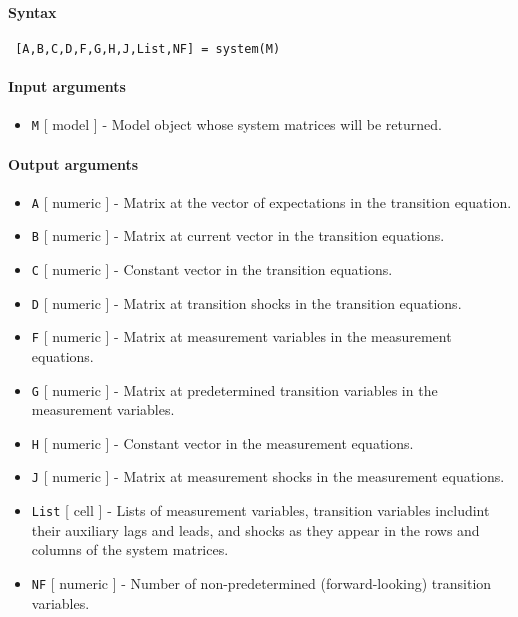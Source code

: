


	\paragraph{Syntax}
 
 \begin{verbatim}
 [A,B,C,D,F,G,H,J,List,NF] = system(M)
 \end{verbatim}
 
 \paragraph{Input arguments}
 
 \begin{itemize}
 \item
   \texttt{M} {[} model {]} - Model object whose system matrices will be
   returned.
 \end{itemize}
 
 \paragraph{Output arguments}
 
 \begin{itemize}
 \item
   \texttt{A} {[} numeric {]} - Matrix at the vector of expectations in
   the transition equation.
 \item
   \texttt{B} {[} numeric {]} - Matrix at current vector in the
   transition equations.
 \item
   \texttt{C} {[} numeric {]} - Constant vector in the transition
   equations.
 \item
   \texttt{D} {[} numeric {]} - Matrix at transition shocks in the
   transition equations.
 \item
   \texttt{F} {[} numeric {]} - Matrix at measurement variables in the
   measurement equations.
 \item
   \texttt{G} {[} numeric {]} - Matrix at predetermined transition
   variables in the measurement variables.
 \item
   \texttt{H} {[} numeric {]} - Constant vector in the measurement
   equations.
 \item
   \texttt{J} {[} numeric {]} - Matrix at measurement shocks in the
   measurement equations.
 \item
   \texttt{List} {[} cell {]} - Lists of measurement variables,
   transition variables includint their auxiliary lags and leads, and
   shocks as they appear in the rows and columns of the system matrices.
 \item
   \texttt{NF} {[} numeric {]} - Number of non-predetermined
   (forward-looking) transition variables.
 \end{itemize}
 
